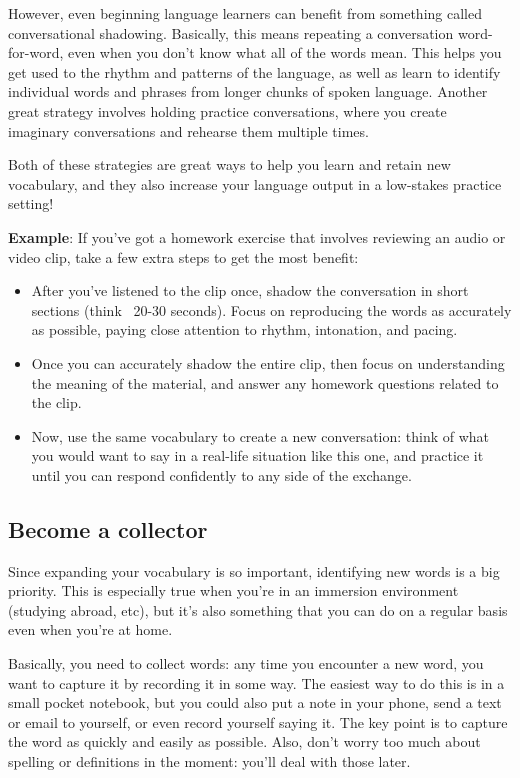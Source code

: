 \documentclass[../main.tex]{subfiles}
\begin{document}
However, even beginning language learners can benefit from something called
conversational shadowing. Basically, this means repeating a conversation
word-for-word, even when you don’t know what all of the words mean. This helps
you get used to the rhythm and patterns of the language, as well as learn to
identify individual words and phrases from longer chunks of spoken language.
Another great strategy involves holding practice conversations, where you create
imaginary conversations and rehearse them multiple times.

Both of these strategies are great ways to help you learn and retain new
vocabulary, and they also increase your language output in a low-stakes practice
setting!

\textbf{Example}: If you’ve got a homework exercise that involves reviewing an
audio or video clip, take a few extra steps to get the most benefit:
%
\begin{itemize}
  \item After you’ve listened to the clip once, shadow the conversation in short
    sections (think ~20-30 seconds). Focus on reproducing the words as
    accurately as possible, paying close attention to rhythm, intonation, and
    pacing.
  \item Once you can accurately shadow the entire clip, then focus on
    understanding the meaning of the material, and answer any homework questions
    related to the clip.
  \item Now, use the same vocabulary to create a new conversation: think of what
    you would want to say in a real-life situation like this one, and practice
    it until you can respond confidently to any side of the exchange.
\end{itemize}
%
\subsection{Become a collector}
Since expanding your vocabulary is so important, identifying new words is a big
priority. This is especially true when you’re in an immersion environment
(studying abroad, etc), but it’s also something that you can do on a regular
basis even when you’re at home.

Basically, you need to collect words: any time you encounter a new word, you
want to capture it by recording it in some way. The easiest way to do this is in
a small pocket notebook, but you could also put a note in your phone, send a
text or email to yourself, or even record yourself saying it. The key point is
to capture the word as quickly and easily as possible. Also, don’t worry too
much about spelling or definitions in the moment: you’ll deal with those later.
\end{document}
